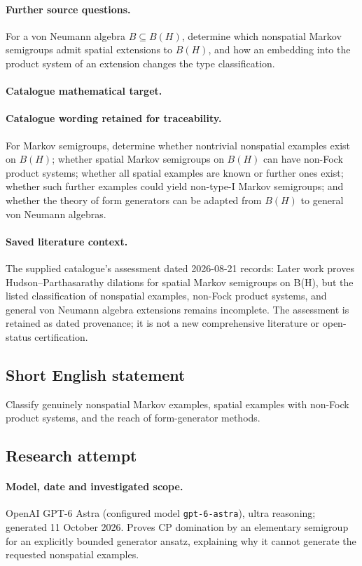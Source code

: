 \documentclass[11pt]{article}
\begin{document}
\paragraph{Further source questions.} For a von Neumann algebra $B\subseteq B(H)$, determine which nonspatial Markov semigroups admit spatial extensions to $B(H)$, and how an embedding into the product system of an extension changes the type classification.

\paragraph{Catalogue mathematical target.}
\paragraph{Catalogue wording retained for traceability.}
For Markov semigroups, determine whether nontrivial nonspatial examples exist on $B(H)$; whether spatial Markov semigroups on $B(H)$ can have non-Fock product systems; whether all spatial examples are known or further ones exist; whether such further examples could yield non-type-I Markov semigroups; and whether the theory of form generators can be adapted from $B(H)$ to general von Neumann algebras.

\paragraph{Saved literature context.} The supplied catalogue's assessment dated 2026-08-21 records: Later work proves Hudson--Parthasarathy dilations for spatial Markov semigroups on B(H), but the listed classification of nonspatial examples, non-Fock product systems, and general von Neumann algebra extensions remains incomplete. The assessment is retained as dated provenance; it is not a new comprehensive literature or open-status certification.
\subsection{Short English statement}
Classify genuinely nonspatial Markov examples, spatial examples with non-Fock product systems, and the reach of form-generator methods.
\subsection{Research attempt}
\paragraph{Model, date and investigated scope.}
OpenAI GPT-6 Astra (configured model \texttt{gpt-6-astra}), ultra reasoning; generated 11 October 2026. Proves CP domination by an elementary semigroup for an explicitly bounded generator ansatz, explaining why it cannot generate the requested nonspatial examples.
\end{document}
